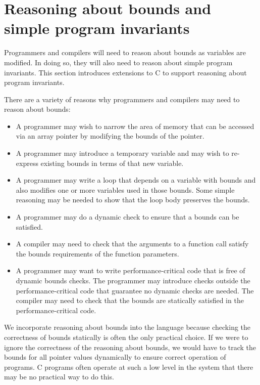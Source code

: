 
\chapter{Reasoning about bounds and simple program invariants}
\label{chapter:simple-invariants}

Programmers and compilers will need to reason about bounds as variables
are modified. In doing so, they will also need to reason about simple
program invariants. This section introduces extensions to C to support
reasoning about program invariants.

There are a variety of reasons why programmers and compilers may need to
reason about bounds:

\begin{itemize}
\item
  A programmer may wish to narrow the area of memory that can be
  accessed via an array pointer by modifying the bounds of the pointer.
\item
  A programmer may introduce a temporary variable and may wish to
  re-express existing bounds in terms of that new variable.
\item
  A programmer may write a loop that depends on a variable with bounds
  and also modifies one or more variables used in those bounds. Some
  simple reasoning may be needed to show that the loop body preserves
  the bounds.
\item
  A programmer may do a dynamic check to ensure that a bounds can be
  satisfied.
\item
  A compiler may need to check that the arguments to a function call
  satisfy the bounds requirements of the function parameters.
\item
  A programmer may want to write performance-critical code that is free
  of dynamic bounds checks. The programmer may introduce checks outside
  the performance-critical code that guarantee no dynamic checks are
  needed. The compiler may need to check that the bounds are statically
  satisfied in the performance-critical code.
\end{itemize}

We incorporate reasoning about bounds into the language because checking
the correctness of bounds statically is often the only practical choice.
If we were to ignore the correctness of the reasoning about bounds, we
would have to track the bounds for all pointer values dynamically to
ensure correct operation of programs. C programs often operate at such a
low level in the system that there may be no practical way to do this.

